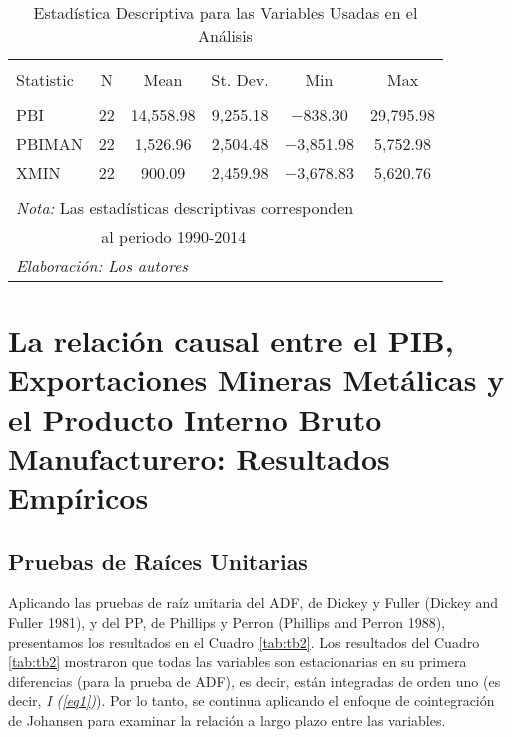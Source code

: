 \documentclass[11pt,]{article}
\begin{document}
\begin{table}[!htbp] \centering 
  \caption{Estadística Descriptiva para las Variables Usadas en el Análisis} 
  \label{tab:descript} 
\small 
\begin{tabular}{@{\extracolsep{5pt}}lccccc} 
\\[-1.8ex]\hline \\[-1.8ex] 
Statistic & \multicolumn{1}{c}{N} & \multicolumn{1}{c}{Mean} & \multicolumn{1}{c}{St. Dev.} & \multicolumn{1}{c}{Min} & \multicolumn{1}{c}{Max} \\ 
\hline 
\hline \\[-1.8ex] 
PBI & 22 & 14,558.98 & 9,255.18 & $-$838.30 & 29,795.98 \\ 
PBIMAN & 22 & 1,526.96 & 2,504.48 & $-$3,851.98 & 5,752.98 \\ 
XMIN & 22 & 900.09 & 2,459.98 & $-$3,678.83 & 5,620.76 \\ 
\hline 
\hline \\[-1.8ex] 
\multicolumn{6}{l}{\footnotesize{\textit{Nota:} Las estadísticas descriptivas corresponden}} \\ 
\multicolumn{6}{l}{\footnotesize{~~~~~~~~~~ al periodo 1990-2014}} \\ 
\multicolumn{6}{l}{\footnotesize{\textit{Elaboración: Los autores}}} \\ 
\end{tabular} 
\end{table}

\hypertarget{la-relacion-causal-entre-el-pib-exportaciones-mineras-metalicas-y-el-producto-interno-bruto-manufacturero-resultados-empiricos}{%
\section{La relación causal entre el PIB, Exportaciones Mineras
Metálicas y el Producto Interno Bruto Manufacturero: Resultados
Empíricos}\label{la-relacion-causal-entre-el-pib-exportaciones-mineras-metalicas-y-el-producto-interno-bruto-manufacturero-resultados-empiricos}}

\hypertarget{pruebas-de-raices-unitarias}{%
\subsection{Pruebas de Raíces
Unitarias}\label{pruebas-de-raices-unitarias}}

Aplicando las pruebas de raíz unitaria del ADF, de Dickey y Fuller
(Dickey and Fuller 1981), y del PP, de Phillips y Perron (Phillips and
Perron 1988), presentamos los resultados en el Cuadro \ref{tab:tb2}. Los
resultados del Cuadro \ref{tab:tb2} mostraron que todas las variables
son estacionarias en su primera diferencias (para la prueba de ADF), es
decir, están integradas de orden uno (es decir, \emph{I (\ref{eq1})}).
Por lo tanto, se continua aplicando el enfoque de cointegración de
Johansen para examinar la relación a largo plazo entre las variables.
\end{document}
